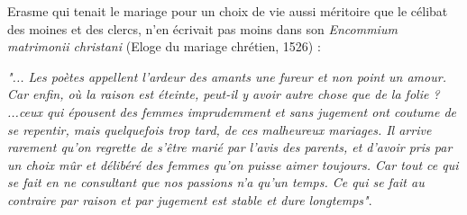 Erasme qui tenait le mariage pour un choix de vie aussi méritoire que le célibat des moines et des clercs, n'en écrivait pas moins dans son \emph{Encommium matrimonii christani} (Eloge du mariage chrétien, 1526) : 

\begin{displayquote}
\emph{"... Les poètes appellent l'ardeur des amants une fureur et non point un amour. Car enfin, où la raison est éteinte, peut-il y avoir autre chose que de la folie ? ...ceux qui épousent des femmes imprudemment et sans jugement ont coutume de se repentir, mais quelquefois trop tard, de ces malheureux mariages. Il arrive rarement qu'on regrette de s'être marié par l'avis des parents, et d'avoir pris par un choix mûr et délibéré des femmes qu'on puisse aimer toujours. Car tout ce qui se fait en ne consultant que nos passions n'a qu'un temps. Ce qui se fait au contraire par raison et par jugement est stable et dure longtemps"}.  
\end{displayquote}

